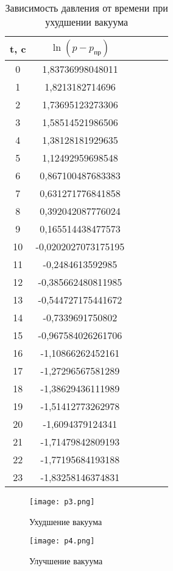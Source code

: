 \begin{table}[h]
\centering
\begin{tabular}[h]{|c|c|c|c|c|c|}
    \hline
    t, c & $\ln (p - p_\text{пр})$ \\
    \hline
    0 & 1,83736998048011 \\
    \hline
    1 & 1,8213182714696 \\
    \hline
    2 & 1,73695123273306 \\
    \hline
    3 & 1,58514521986506 \\
    \hline
    4 & 1,38128181929635 \\
    \hline
    5 & 1,12492959698548 \\
    \hline
    6 & 0,867100487683383 \\
    \hline
    7 & 0,631271776841858 \\
    \hline
    8 & 0,392042087776024 \\
    \hline
    9 & 0,165514438477573 \\
    \hline
    10 & -0,0202027073175195 \\
    \hline
    11 & -0,2484613592985 \\
    \hline
    12 & -0,385662480811985 \\
    \hline
    13 & -0,544727175441672 \\
    \hline
    14 & -0,7339691750802 \\
    \hline
    15 & -0,967584026261706 \\
    \hline
    16 & -1,10866262452161 \\
    \hline
    17 & -1,27296567581289 \\
    \hline
    18 & -1,38629436111989 \\
    \hline
    19 & -1,51412773262978 \\
    \hline
    20 & -1,6094379124341 \\
    \hline
    21 & -1,71479842809193 \\
    \hline
    22 & -1,77195684193188 \\
    \hline
    23 & -1,83258146374831 \\
    \hline
\end{tabular}
\caption{Зависимость давления от времени при ухудшении вакуума}
\end{table}

\begin{figure}[h]
\centering
\texttt{[image: p3.png]}
\caption{Ухудшение вакуума}
\end{figure}

\begin{figure}[h]
\centering
\texttt{[image: p4.png]}
\caption{Улучшение вакуума}
\end{figure}
